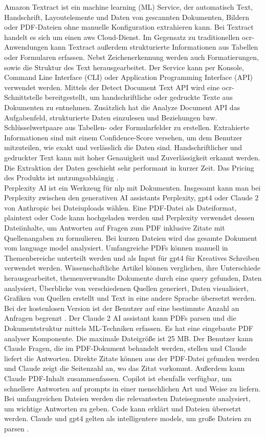 Amazon Textract ist ein machine learning (ML) Service, der automatisch Text, Handschrift, Layoutelemente und Daten von gescannten Dokumenten, Bildern oder PDF-Dateien ohne manuelle Konfiguration extrahieren kann. Bei Textract handelt es sich um einen \gls{aws} Cloud-Dienst. Im Gegensatz zu traditionellen \gls{ocr}-Anwendungen kann Textract außerdem strukturierte Informationen aus Tabellen oder Formularen erfassen. Nebst Zeichenerkennung werden auch Formatierungen, sowie die Struktur des Text herausgearbeitet. Der Service kann per Konsole, Command Line Interface (CLI) oder Application Programming Interface (API) verwendet werden. Mittels der Detect Document Text API wird eine \gls{ocr}-Schnittstelle bereitgestellt, um handschriftliche oder gedruckte Texte aus Dokumenten zu entnehmen. Zusätzlich hat die Analyze Document API das Aufgabenfeld, strukturierte Daten einzulesen und Beziehungen bzw. Schlüsselwertpaare aus Tabellen- oder Formularfelder zu erstellen. Extrahierte Informationen sind mit einem Confidence-Score versehen, um dem Benutzer mitzuteilen, wie exakt und verlässlich die Daten sind. Handschriftlicher und gedruckter Text kann mit hoher Genauigkeit und Zuverlässigkeit erkannt werden. Die Extraktion der Daten geschieht sehr performant in kurzer Zeit. Das Pricing des Produkts ist nutzungsabhängig \cite{textract}. \\
Perplexity AI ist ein Werkzeug für \gls{nlp} mit Dokumenten. Insgesamt kann man bei Perplexity zwischen den generativen AI assistants Perplexity, \gls{gpt4} oder Claude 2 von Anthropic bei Dateiuploads wählen. Eine PDF-Datei als Dateiformat, plaintext oder Code kann hochgeladen werden und Perplexity verwendet dessen Dateiinhalte, um Antworten auf Fragen zum PDF inklusive Zitate mit Quellenangaben zu formulieren. Bei kurzen Dateien wird das gesamte Dokument vom language model analysiert. Umfangreiche PDFs können manuell in Themenbereiche unterteilt werden und als Input für \gls{gpt4} für Kreatives Schreiben verwendet werden. Wissenschaftliche Artikel können verglichen, ihre Unterschiede herausgearbeitet, themenverwandte Dokumente durch eine query gefunden, Daten analysiert, Überblicke von verschiedenen Quellen generiert, Daten visualisiert, Grafiken von Quellen erstellt und Text in eine andere Sprache übersetzt werden. Bei der kostenlosen Version ist der Benutzer auf eine bestimmte Anzahl an Anfragen begrenzt \cite{hackernoon-claude}. Der Claude 2 AI assistant kann PDFs parsen und die Dokumentstruktur mittels ML-Techniken erfassen. Es hat eine eingebaute PDF analyser Komponente. Die maximale Dateigröße ist 25 MB. Der Benutzer kann Claude Fragen, die im PDF-Dokument behandelt werden, stellen und Claude liefert die Antworten. Direkte Zitate können aus der PDF-Datei gefunden werden und Claude zeigt die Seitenzahl an, wo das Zitat vorkommt. Außerdem kann Claude PDF-Inhalt zusammenfassen. Copilot ist ebenfalls verfügbar, um schnellere Antworten auf prompts in einer menschlichen Art und Weise zu liefern. Bei umfangreichen Dateien werden die relevantesten Dateisegmente analysiert, um wichtige Antworten zu geben. Code kann erklärt und Dateien übersetzt werden. Claude und \gls{gpt4} gelten als intelligentere models, um große Dateien zu parsen \cite{perplexity}. \\
